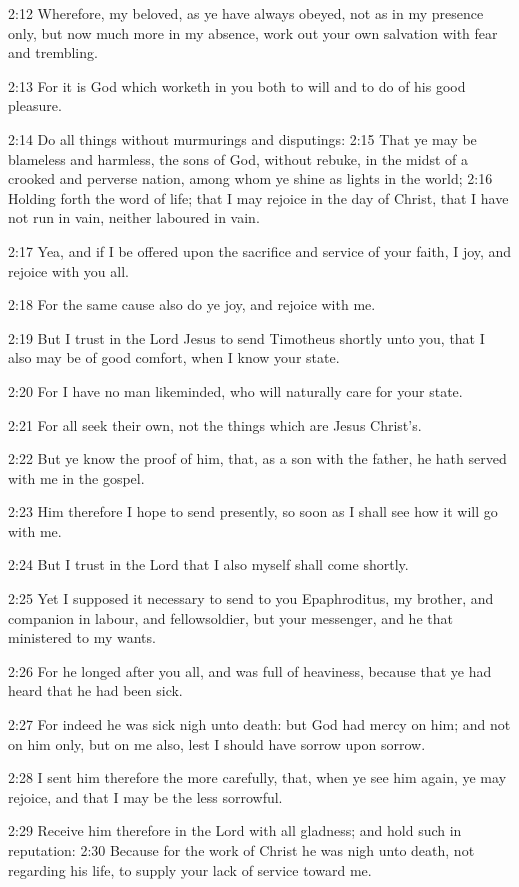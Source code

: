 2:12 Wherefore, my beloved, as ye have always obeyed, not as in my
presence only, but now much more in my absence, work out your own
salvation with fear and trembling.

2:13 For it is God which worketh in you both to will and to do of his
good pleasure.

2:14 Do all things without murmurings and disputings: 2:15 That ye may
be blameless and harmless, the sons of God, without rebuke, in the
midst of a crooked and perverse nation, among whom ye shine as lights
in the world; 2:16 Holding forth the word of life; that I may rejoice
in the day of Christ, that I have not run in vain, neither laboured in
vain.

2:17 Yea, and if I be offered upon the sacrifice and service of your
faith, I joy, and rejoice with you all.

2:18 For the same cause also do ye joy, and rejoice with me.

2:19 But I trust in the Lord Jesus to send Timotheus shortly unto you,
that I also may be of good comfort, when I know your state.

2:20 For I have no man likeminded, who will naturally care for your
state.

2:21 For all seek their own, not the things which are Jesus Christ's.

2:22 But ye know the proof of him, that, as a son with the father, he
hath served with me in the gospel.

2:23 Him therefore I hope to send presently, so soon as I shall see
how it will go with me.

2:24 But I trust in the Lord that I also myself shall come shortly.

2:25 Yet I supposed it necessary to send to you Epaphroditus, my
brother, and companion in labour, and fellowsoldier, but your
messenger, and he that ministered to my wants.

2:26 For he longed after you all, and was full of heaviness, because
that ye had heard that he had been sick.

2:27 For indeed he was sick nigh unto death: but God had mercy on him;
and not on him only, but on me also, lest I should have sorrow upon
sorrow.

2:28 I sent him therefore the more carefully, that, when ye see him
again, ye may rejoice, and that I may be the less sorrowful.

2:29 Receive him therefore in the Lord with all gladness; and hold
such in reputation: 2:30 Because for the work of Christ he was nigh
unto death, not regarding his life, to supply your lack of service
toward me.


